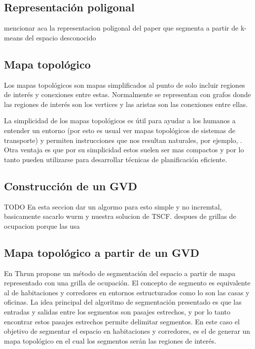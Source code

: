 \subsection{Representación poligonal}

mencionar aca la representacion poligonal del paper que segmenta a partir de k-means del espacio desconocido

\subsection{Mapa topológico}\cite{Thrun1998}\cite{Liu2015}
Los mapas topológicos son mapas simplificados al punto de solo incluir regiones de interés y conexiones entre estas. Normalmente se representan con grafos donde las regiones de interés son los vertices y las aristas son las conexiones entre ellas.


La simplicidad de los mapas topológicos es útil para ayudar a los humanos a entender un entorno (por esto es usual ver mapas topológicos de sistemas de transporte) y permiten instrucciones que nos resultan naturales, por ejemplo, . Otra ventaja es que por su simplicidad estos suelen ser mas compactos y por lo tanto pueden utilizarse para desarrollar técnicas de planificación eficiente.

\subsection{Construcción de un GVD} 
TODO
En esta seccion dar un algormo para esto simple y no incremtal, basicamente sacarlo wurm y nuestra solucion de TSCF.
despues de grillas de ocupacion porque las usa

\subsection{Mapa topológico a partir de un GVD}
En \cite{Thrun1998} Thrun propone un método de segmentación del espacio a partir de mapa representado con una grilla de ocupación. El concepto de segmento es equivalente al de habitaciones y corredores en entornos estructurados como lo son las casas y oficinas. La idea principal del algoritmo de segmentación presentado es que las entradas y salidas entre los segmentos son pasajes estrechos, y por lo tanto encontrar estos pasajes estrechos permite delimitar segmentos. En este caso el objetivo de segmentar el espacio en habitaciones y corredores, es el de generar un mapa topológico en el cual los segmentos serán las regiones de interés.

